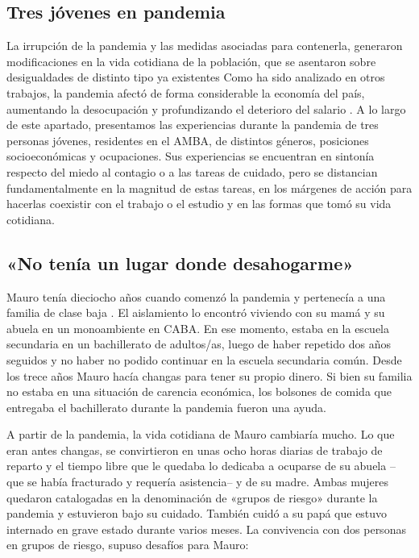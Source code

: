 \begin{refsection}
\section[Tres jóvenes en pandemia]{Tres jóvenes en pandemia}
\label{cap-27.tres-jovenes-en-pandemia}
La irrupción de la pandemia y las medidas asociadas para contenerla, generaron modificaciones en la vida cotidiana de la población, que se asentaron sobre desigualdades de distinto tipo ya existentes \protect\parencite{4249-DALLE2022} Como ha sido analizado en otros trabajos, la pandemia afectó de forma considerable la economía del país, aumentando la desocupación y profundizando el deterioro del salario \protect\parencite{4246-CHAVEZMOLINA2022}. A lo largo de este apartado, presentamos las experiencias durante la pandemia de tres personas jóvenes, residentes en el AMBA, de distintos géneros, posiciones socioeconómicas y ocupaciones. Sus experiencias se encuentran en sintonía respecto del miedo al contagio o a las tareas de cuidado, pero se distancian fundamentalmente en la magnitud de estas tareas, en los márgenes de acción para hacerlas coexistir con el trabajo o el estudio y en las formas que tomó su vida cotidiana.


\subsection[«No tenía un lugar donde desahogarme»]{«No tenía un lugar donde desahogarme»}
\label{cap-27.no-tenia-un-lugar-donde-desahogarme}
Mauro tenía dieciocho años cuando comenzó la pandemia y pertenecía a una familia de clase baja \protect\parencite{4185-CLEMENCEAU2016}. El aislamiento lo encontró viviendo con su mamá y su abuela en un monoambiente en CABA. En ese momento, estaba en la escuela secundaria en un bachillerato de adultos/as, luego de haber repetido dos años seguidos y no haber no podido continuar en la escuela secundaria común. Desde los trece años Mauro hacía changas para tener su propio dinero. Si bien su familia no estaba en una situación de carencia económica, los bolsones de comida que entregaba el bachillerato durante la pandemia fueron una ayuda.

A partir de la pandemia, la vida cotidiana de Mauro cambiaría mucho. Lo que eran antes changas, se convirtieron en unas ocho horas diarias de trabajo de reparto y el tiempo libre que le quedaba lo dedicaba a ocuparse de su abuela –que se había fracturado y requería asistencia– y de su madre. Ambas mujeres quedaron catalogadas en la denominación de «grupos de riesgo» durante la pandemia y estuvieron bajo su cuidado. También cuidó a su papá que estuvo internado en grave estado durante varios meses. La convivencia con dos personas en grupos de riesgo, supuso desafíos para Mauro:



\end{refsection}
